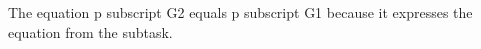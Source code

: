 The equation p subscript G2 equals p subscript G1 because it expresses the equation from the subtask.